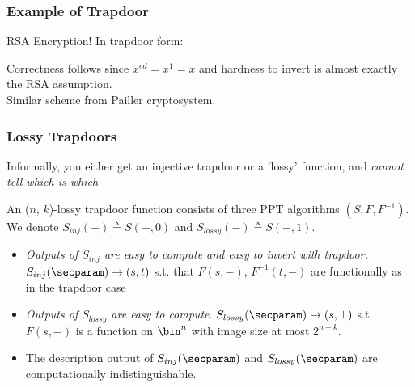 \documentclass{beamer}
\begin{document}
\begin{frame}
    \frametitle{Example of Trapdoor}
    RSA Encryption! In trapdoor form:
    \begin{pchstack}[center]
                  \begin{pcvstack}
                  \end{pcvstack}
                  
              \end{pchstack}
    Correctness follows since $x^{ed} = x^1 = x$ and hardness to invert is almost exactly the RSA assumption. \\
    Similar scheme from Pailler cryptosystem.
    
\end{frame}

\begin{frame}
    \frametitle{Lossy Trapdoors}
    Informally, you either get an injective trapdoor or a 'lossy' function, and \textit{cannot tell which is which}
    \begin{definition}
        An ($n$, $k$)-lossy trapdoor function consists of three PPT algorithms $(S, F, F^{-1})$.
        We denote $S_{inj}({-}) \triangleq S({-}, 0)$ and $S_{lossy}({-}) \triangleq S({-}, 1)$.
        \begin{itemize}
            \item \textit{Outputs of $S_{inj}$ are easy to compute and easy to invert with trapdoor.}
                  $S_{inj}(\secparam) \rightarrow (s, t)$ s.t. that $F(s, {-})$, $F^{-1}(t, {-})$ are functionally as in the trapdoor case
            \item \textit{Outputs of $S_{lossy}$ are easy to compute}.
                  $S_{lossy}(\secparam) \rightarrow (s, \bot)$ s.t. $F(s, {-})$ is a function on $\bin^n$
                  with image size at most $2^{n-k}$.
            \item The description output of $S_{inj}(\secparam)$ and $S_{lossy}(\secparam)$ are computationally indistinguishable.
        \end{itemize}
    \end{definition}
\end{frame}
\end{document}
